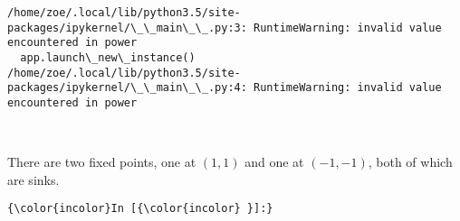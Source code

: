 \documentclass[11pt]{article}
\begin{document}
    \begin{Verbatim}[commandchars=\\\{\}]
/home/zoe/.local/lib/python3.5/site-packages/ipykernel/\_\_main\_\_.py:3: RuntimeWarning: invalid value encountered in power
  app.launch\_new\_instance()
/home/zoe/.local/lib/python3.5/site-packages/ipykernel/\_\_main\_\_.py:4: RuntimeWarning: invalid value encountered in power

    \end{Verbatim}

    \begin{center}
    \end{center}
    { \hspace*{\fill} \\}
    
    There are two fixed points, one at \((1, 1)\) and one at \((-1, -1)\),
both of which are sinks.

    \begin{Verbatim}[commandchars=\\\{\}]
{\color{incolor}In [{\color{incolor} }]:} 
\end{Verbatim}


    
    
    
    
\end{document}
